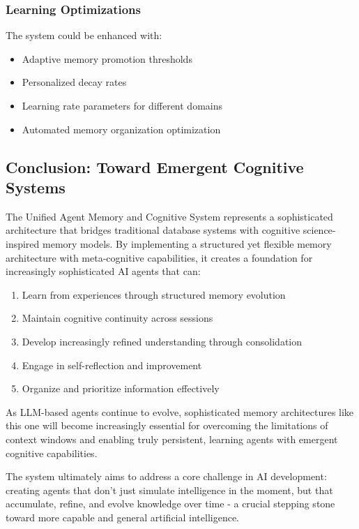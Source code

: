 \documentclass[12pt,a4paper]{article}
\begin{document}
\subsubsection*{Learning Optimizations}

The system could be enhanced with:
\begin{itemize}
    \item Adaptive memory promotion thresholds
    \item Personalized decay rates
    \item Learning rate parameters for different domains
    \item Automated memory organization optimization
\end{itemize}

\subsection*{Conclusion: Toward Emergent Cognitive Systems}

The Unified Agent Memory and Cognitive System represents a sophisticated architecture that bridges traditional database systems with cognitive science-inspired memory models. By implementing a structured yet flexible memory architecture with meta-cognitive capabilities, it creates a foundation for increasingly sophisticated AI agents that can:

\begin{enumerate}[label=\arabic*.]
    \item Learn from experiences through structured memory evolution
    \item Maintain cognitive continuity across sessions
    \item Develop increasingly refined understanding through consolidation
    \item Engage in self-reflection and improvement
    \item Organize and prioritize information effectively
\end{enumerate}

As LLM-based agents continue to evolve, sophisticated memory architectures like this one will become increasingly essential for overcoming the limitations of context windows and enabling truly persistent, learning agents with emergent cognitive capabilities.

The system ultimately aims to address a core challenge in AI development: creating agents that don't just simulate intelligence in the moment, but that accumulate, refine, and evolve knowledge over time - a crucial stepping stone toward more capable and general artificial intelligence.
\end{document}

